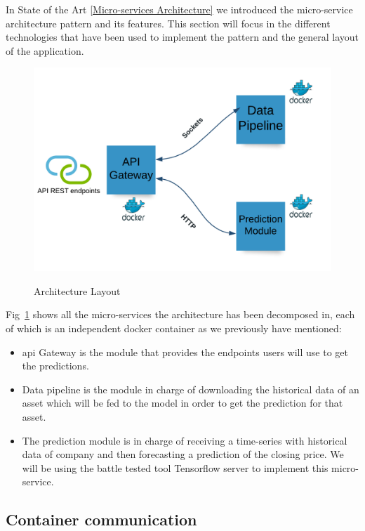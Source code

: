 In State of the Art \ref{Micro-services Architecture} we introduced the micro-service architecture pattern and its features. This section will focus in the different technologies that have been used to implement the pattern and the general layout of the application.

\begin{figure}[h]
    \centering
    \caption{Architecture Layout}
    \includegraphics[width=\textwidth]{figures/architecture.png}
    \label{fig:architecture-layout}
\end{figure}

Fig~\ref{fig:architecture-layout} shows all the micro-services the architecture has been decomposed in, each of which is an independent docker container as we previously have mentioned:

\begin{itemize}
    \item \gls{api} Gateway is the module that provides the endpoints users will use to get the predictions.
    \item Data pipeline is the module in charge of downloading the historical data of an asset which will be fed to the model in order to get the prediction for that asset.
    \item The prediction module is in charge of receiving a time-series with historical data of company and then forecasting a prediction of the closing price. We will be using the battle tested tool Tensorflow server to implement this micro-service.
\end{itemize}

\subsection{Container communication}
\label{Container communication}

